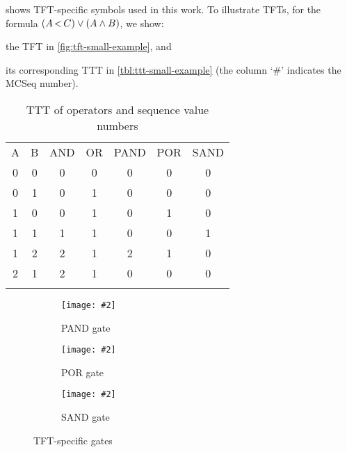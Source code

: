\documentclass[12pt,openright,twoside,a4paper,oldfontcommands,english,brazil,final]{abntex2}
\theoremstyle{theo}
\newcommand{\includegraphicsaspectratio}[2][1]{%
  \texttt{[image: \#2]}%
}
\newcommand{\parsin}[1]{\ensuremath\left( #1 \right)}
\def\pand{\ensuremath\operatorname{<}}
\begin{document}
%
 shows \ac{TFT}-specific symbols used in this work.
To illustrate \acp{TFT}, for the formula $\parsin{A \pand C} \lor \parsin{A \land B}$, we show:
\begin{alineasinline}
  \item the \ac{TFT} in \cref{fig:tft-small-example}, and
  \item its corresponding \ac{TTT} in \cref{tbl:ttt-small-example} (the column `\#' indicates the \ac{MCSeq} number).
\end{alineasinline}

\begin{table}
\caption{\acs{TTT} of  operators and sequence value numbers}
\label{tbl:tft-operators}
\centering
\begin{tabular}{ccccccc}
\hline\noalign{\smallskip}
A & B & \ac{AND} & \ac{OR} & \ac{PAND} & \ac{POR} & \ac{SAND}  \\
\noalign{\smallskip}\hline\noalign{\smallskip}
0 & 0 & 0 & 0 & 0 & 0 & 0\\
0 & 1 & 0 & 1 & 0 & 0 & 0\\
1 & 0 & 0 & 1 & 0 & 1 & 0\\
1 & 1 & 1 & 1 & 0 & 0 & 1\\
1 & 2 & 2 & 1 & 2 & 1 & 0\\
2 & 1 & 2 & 1 & 0 & 0 & 0\\
\noalign{\smallskip}\hline
\end{tabular}
\end{table}

\begin{figure}[htb]
  \centering
  \begin{subfigure}[b]{0.20\linewidth}
    \centering
    \includegraphicsaspectratio[0.75]{ft-symbol-pand-gate}
    \caption{\acs*{PAND} gate}\label{fig:tft-pand-gate}
  \end{subfigure}
  \begin{subfigure}[b]{0.20\linewidth}
    \centering
    \includegraphicsaspectratio[0.75]{ft-symbol-por-gate}
    \caption{\acs*{POR} gate}\label{fig:tft-por-gate}
  \end{subfigure}
  \begin{subfigure}[b]{0.20\linewidth}
    \centering
    \includegraphicsaspectratio[0.75]{ft-symbol-sand-gate}
    \caption{\acs*{SAND} gate}\label{fig:tft-sand-gate}
  \end{subfigure}
  \caption{\acs*{TFT}-specific gates}
  \label{fig:tft-symbols}
\end{figure}
\end{document}
